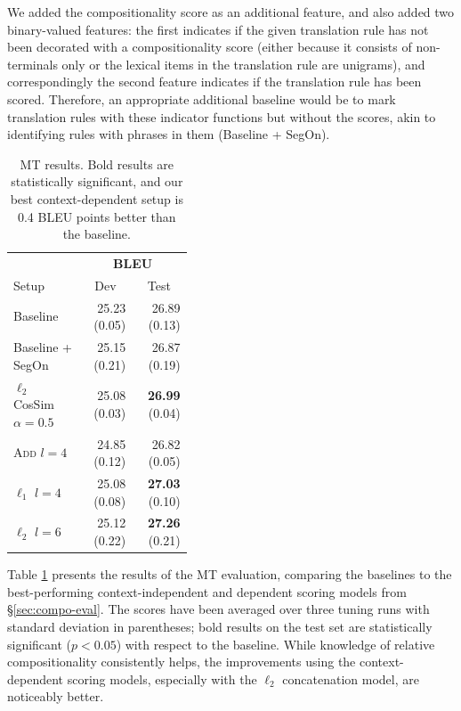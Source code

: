 \documentclass[11pt,letterpaper]{article}
\begin{document}
We added the compositionality score as an additional feature, and also added two binary-valued features: the first indicates if the given translation rule has not been decorated with a compositionality score (either because it consists of non-terminals only or the lexical items in the translation rule are unigrams), and correspondingly the second feature indicates if the translation rule has been scored. 
Therefore, an appropriate additional baseline would be to mark translation rules with these indicator functions but without the scores, akin to identifying rules with phrases in them (Baseline + SegOn). 

\begin{table}[h!]
  \begin{center}
    \begin{tabular}{p{0.4\linewidth}rr}
      \hline
	  & \multicolumn{2}{c}{\bf BLEU} \\
      Setup &  \multicolumn{1}{c}{Dev} & \multicolumn{1}{c}{Test} \\
	  \hline
	  Baseline & 25.23 (0.05) & 26.89 (0.13) \\
      Baseline + SegOn & 25.15 (0.21) & 26.87 (0.19) \\
	  $\ell_2$ CosSim $\alpha=0.5$ &  25.08 (0.03) & {\bf26.99} (0.04) \\
  	  \textsc{Add} $l=4$ &  24.85 (0.12) & 26.82 (0.05) \\
      $\ell_1$ $l=4$ &  25.08 (0.08) & {\bf 27.03} (0.10) \\
	  $\ell_2$  $l=6$ & 25.12 (0.22) & {\bf 27.26} (0.21) \\
	\end{tabular}
  \end{center}
  \caption{MT results. Bold results are statistically significant, and our best context-dependent setup is 0.4 BLEU points better than the baseline.}
  \label{tab:mt-results}
\end{table}

Table \ref{tab:mt-results} presents the results of the MT evaluation, comparing the baselines to the best-performing context-independent and dependent scoring models from \S\ref{sec:compo-eval}. 
The scores have been averaged over three tuning runs with standard deviation in parentheses; bold results on the test set are statistically significant ($p < 0.05$) with respect to the baseline. 
While knowledge of relative compositionality consistently helps, the improvements using the context-dependent scoring models, especially with the $\ell_2$ concatenation model, are noticeably better. 
\end{document}
